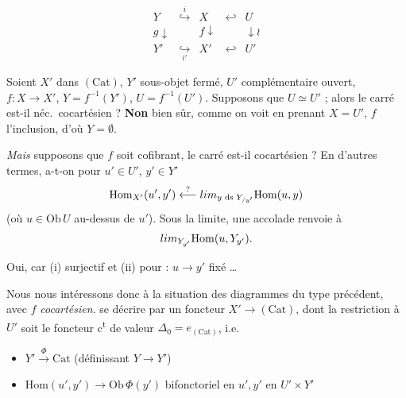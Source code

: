 \documentclass[11pt,a4paper]{article}
\begin{document}

\[
  \begin{array}{ccccc}
    Y & \overset{i}{\hookrightarrow} & X & \hookleftarrow & U \\
    {\scriptstyle g}\downarrow & & {\scriptstyle f}\downarrow & & \downarrow\wr \\
    Y' & \underset{i'}{\hookrightarrow} & X' & \hookleftarrow & U'
  \end{array}
\]

Soient $X'$ dans $(\mathrm{Cat})$, $Y'$ sous-objet fermé, $U'$ complémentaire ouvert, $f : X \to X'$, $Y = f^{-1}(Y')$, $U = f^{-1}(U')$. Supposons que $U \simeq U'$ ; alors  le carré est-il néc.\ cocartésien ? \textbf{Non} bien sûr, comme on voit en prenant $X = U'$, $f$ l'inclusion, d'où $Y = \emptyset$.

\emph{Mais} supposons que $f$ soit cofibrant, le carré est-il cocartésien ? En d'autres termes, a-t-on pour $u' \in U'$, $y' \in Y'$
\[
  \mathrm{Hom}_{X'}(u', y') \overset{?}{\longleftarrow}
  \varinjlim_{y \text{ ds } Y_{/y'}} \mathrm{Hom}(u, y)
\]
(où $u \in \mathrm{Ob}\, U$ au-dessus de $u'$). Sous la limite, une accolade renvoie à
\[
  \varinjlim_{Y_{y'}} \mathrm{Hom}(u, Y_{y'}) .
\]

Oui, car  (i) surjectif et (ii) pour  : $u \to y'$ fixé \ldots

Nous nous intéressons donc à la situation des diagrammes du type précédent, avec $f$ \emph{cocartésien}.  se décrire par un foncteur $X' \to (\mathrm{Cat})$,  dont la restriction à $U'$ soit le foncteur c\textsuperscript{t} de valeur $\Delta_0 = e_{(\mathrm{Cat})}$, i.e.
\begin{itemize}
  \item[(i)] $Y' \xrightarrow{\ \Phi\ } \mathrm{Cat}$ (définissant  $Y \to Y'$)
  \item[(ii)] $\mathrm{Hom}(u', y') \to \mathrm{Ob}\, \Phi(y')$ bifonctoriel en $u', y'$ en $U' \times Y'$
\end{itemize}
\end{document}
